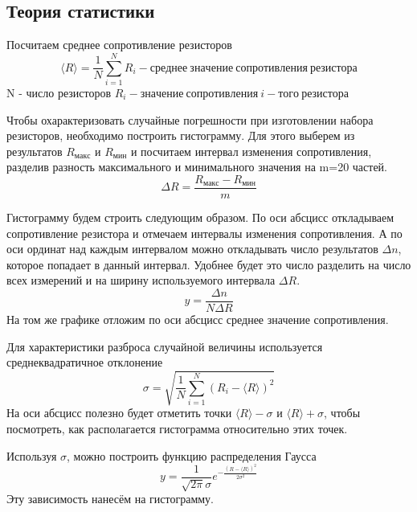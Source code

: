 \documentclass[a4paper, 12pt]{article}
\begin{document}
		\subsection*{Теория статистики}
			Посчитаем среднее сопротивление резисторов
			$$\langle R\rangle = \frac{1}{N} \sum_{i = 1}^{N} R_i - среднее \: значение \: сопротивления \: резистора$$
			N - число резисторов \newline
			$R_i - значение\:сопротивления\:i-того\:резистора$
			\par
			Чтобы охарактеризовать случайные погрешности при изготовлении набора резисторов, необходимо построить гистограмму. Для этого выберем из результатов $R_{макс}$ и $R_{мин}$ и посчитаем интервал изменения сопротивления, разделив разность максимального и минимального значения на m=20 частей.
			$$ \Delta R = \frac{R_{макс}-R_{мин}}{m}$$
			\par
			Гистограмму будем строить следующим образом. По оси абсцисс откладываем сопротивление резистора и отмечаем интервалы изменения сопротивления. А по оси ординат над каждым интервалом можно откладывать число результатов $\Delta n$, которое попадает в данный интервал. Удобнее будет это число разделить на число всех измерений и на ширину используемого интервала $\Delta R$.
			$$y = \frac{\Delta n}{N\Delta R}$$
			На том же графике отложим по оси абсцисс среднее значение сопротивления.
			\par
			Для характеристики разброса случайной величины используется среднеквадратичное отклонение
			$$ \sigma = \sqrt{\frac{1}{N} \sum_{i = 1}^{N}(R_i - \langle R\rangle)^2}$$
			На оси абсцисс полезно будет отметить точки $\langle R\rangle-\sigma$ и $\langle R\rangle+\sigma$, чтобы посмотреть, как располагается гистограмма относительно этих точек.
			\par
			Используя $\sigma$, можно построить функцию распределения Гаусса
			$$y=\frac{1}{\sqrt{2\pi}\sigma}e^{-\frac{(R-\langle R\rangle)^2}{2\sigma^2}}$$
			Эту зависимость нанесём на гистограмму.
\end{document}
